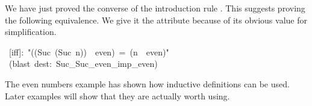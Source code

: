 We have just proved the converse of the introduction rule . 
This suggests proving the following equivalence.  We give it the 
attribute because of its obvious value for simplification.
\begin{isabelle}
\ [iff]:\ "((Suc\ (Suc\ n))\ \isasymin \ even)\ =\ (n\
\isasymin \ even)"\isanewline
{}\ (blast\ dest:\ Suc_Suc_even_imp_even)
\end{isabelle}

The even numbers example has shown how inductive definitions can be used. 
Later examples will show that they are actually worth using.
